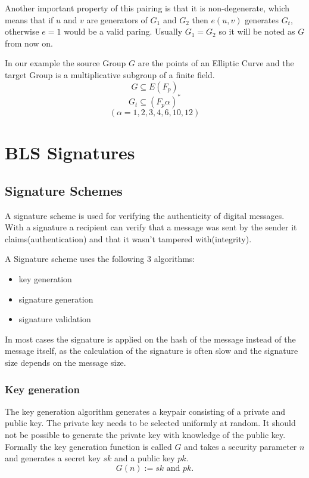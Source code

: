 \documentclass[a4paper,12pt]{scrartcl}
\begin{document}
Another important property of this pairing is that it is non-degenerate, which means that if $u$ and $v$ are generators of $G_1$ and $G_2$ then $e(u,v)$ generates $G_t$, otherwise $e = 1$ would be a valid paring.
Usually $G_1 = G_2$ so it will be noted as $G$ from now on.

In our example the source Group $G$ are the points of an Elliptic Curve and the target Group is a multiplicative subgroup of a finite field.
\[ G \subseteq E(F_p) \]
\[ G_t \subseteq (F_p \alpha)^{*} \]
\[ ( \alpha = 1, 2, 3, 4, 6, 10, 12 ) \]

\pagebreak

\section{BLS Signatures}
\subsection{Signature Schemes}

A signature scheme is used for verifying the authenticity of digital messages. With a signature a recipient can verify that a message was sent by the sender it claims(authentication) and that it wasn't tampered with(integrity).

A Signature scheme uses the following 3 algorithms:
\begin{itemize}
	\item key generation
	\item signature generation
	\item signature validation
\end{itemize}

In most cases the signature is applied on the hash of the message instead of the message itself, as the calculation of the signature is often slow and the signature size depends on the message size. 

\subsubsection{Key generation}

The key generation algorithm generates a keypair consisting of a private and public key. The private key needs to be selected uniformly at random. It should not be possible to generate the private key with knowledge of the public key. Formally the key generation function is called $G$ and takes a security parameter $n$ and generates a secret key $sk$ and a public key $pk$.
\[
G(n) := sk \text{ and } pk.
\]
\end{document}
